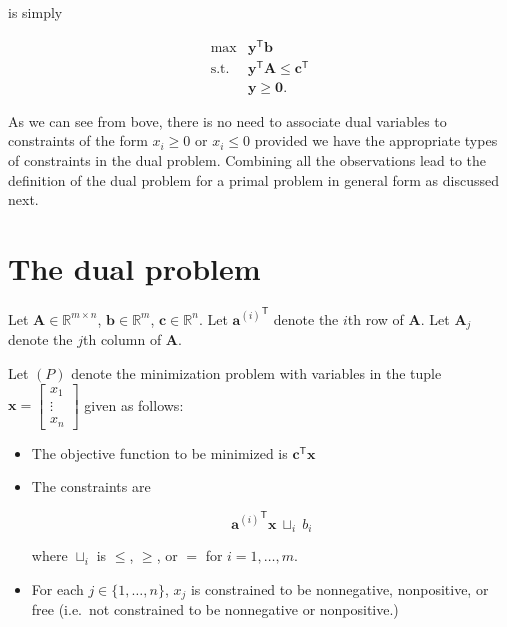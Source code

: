 \documentclass[]{book}
\newcommand{\RR}{\mathbb{R}}
\newcommand{\T}{\mathsf{T}}
\newcommand{\mm}[1]{\mathbf{#1}}
\renewcommand{\vec}[1]{\mathbf{#1}}
\theoremstyle{definition}
\theoremstyle{definition}
\theoremstyle{remark}
\begin{document}
is simply

\begin{equation*}
\begin{array}{rl}
\max & \vec{y}^\T\vec{b} \\
\mbox{s.t.} & \vec{y}^\T\mm{A} \leq \vec{c}^\T \\
& \vec{y} \geq \vec{0}.
\end{array}
\end{equation*}

As we can see from bove, there is no need to associate dual variables to
constraints of the form \(x_i \geq 0\) or \(x_i \leq 0\) provided we
have the appropriate types of constraints in the dual problem. Combining
all the observations lead to the definition of the dual problem for a
primal problem in general form as discussed next.

\hypertarget{primal-dual}{\section{The dual problem}\label{primal-dual}}

Let \(\mm{A} \in \RR^{m\times n}\), \(\vec{b} \in \RR^m\),
\(\vec{c} \in \RR^n\). Let \({\vec{a}^{(i)}}^\T\) denote the \(i\)th row
of \(\mm{A}\). Let \(\mm{A}_j\) denote the \(j\)th column of \(\mm{A}\).

Let \((P)\) denote the minimization problem with variables in the tuple
\(\vec{x} = \begin{bmatrix} x_1\\ \vdots \\ x_n\end{bmatrix}\) given as
follows:

\begin{itemize}
\item
  The objective function to be minimized is \(\vec{c}^\T \vec{x}\)
\item
  The constraints are

  \begin{equation*}{\vec{a}^{(i)}}^\T\vec{x}~\sqcup_i~b_i
  \end{equation*}

  where \(\sqcup_i\) is \(\leq\), \(\geq\), or \(=\) for
  \(i = 1,\ldots, m\).
\item
  For each \(j \in \{1,\ldots,n\}\), \(x_j\) is constrained to be
  nonnegative, nonpositive, or free (i.e.~not constrained to be
  nonnegative or nonpositive.)
\end{itemize}
\end{document}
